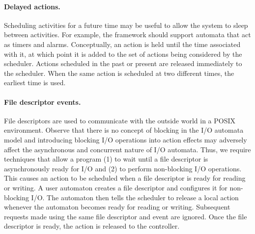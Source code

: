 \paragraph*{Delayed actions.}
Scheduling activities for a future time may be useful to allow the system to sleep between activities.
For example, the framework should support automata that act as timers and alarms.
Conceptually, an action is held until the time associated with it, at which point it is added to the set of actions being considered by the scheduler.
Actions scheduled in the past or present are released immediately to the scheduler.
When the same action is scheduled at two different times, the earliest time is used.

\paragraph*{File descriptor events.}
File descriptors are used to communicate with the outside world in a POSIX environment.
Observe that there is no concept of blocking in the I/O automata model and introducing blocking I/O operations into action effects may adversely affect the asynchronous and concurrent nature of I/O automata.
Thus, we require techniques that allow a program (1) to wait until a file descriptor is asynchronously ready for I/O and (2) to perform non-blocking I/O operations.
This causes an action to be scheduled when a file descriptor is ready for reading or writing.
A user automaton creates a file descriptor and configures it for non-blocking I/O.
The automaton then tells the scheduler to release a local action whenever the automaton becomes ready for reading or writing.
Subsequent requests made using the same file descriptor and event are ignored.
Once the file descriptor is ready, the action is released to the controller.

